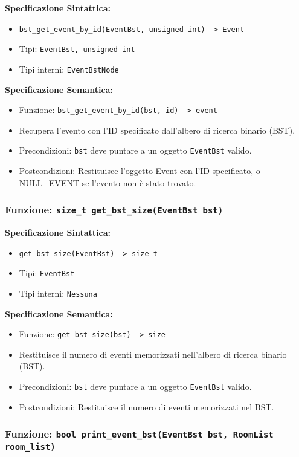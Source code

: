 \documentclass[11pt]{scrartcl} %
\begin{document}
\textbf{Specificazione Sintattica:}
\begin{itemize}
\item \texttt{bst\_get\_event\_by\_id(EventBst, unsigned int) -> Event}
\item Tipi: \texttt{EventBst, unsigned int}
\item Tipi interni: \texttt{EventBstNode}
\end{itemize}

\textbf{Specificazione Semantica:}
\begin{itemize}
\item Funzione: \texttt{bst\_get\_event\_by\_id(bst, id) -> event}
\item Recupera l'evento con l'ID specificato dall'albero di ricerca binario (BST).
\item Precondizioni: \texttt{bst} deve puntare a un oggetto \texttt{EventBst} valido.
\item Postcondizioni: Restituisce l'oggetto Event con l'ID specificato, o NULL\_EVENT se l'evento non è stato trovato.
\end{itemize}

\subsubsection{Funzione: \texttt{size\_t get\_bst\_size(EventBst bst)}}

\textbf{Specificazione Sintattica:}
\begin{itemize}
\item \texttt{get\_bst\_size(EventBst) -> size\_t}
\item Tipi: \texttt{EventBst}
\item Tipi interni: \texttt{Nessuna}
\end{itemize}

\textbf{Specificazione Semantica:}
\begin{itemize}
\item Funzione: \texttt{get\_bst\_size(bst) -> size}
\item Restituisce il numero di eventi memorizzati nell'albero di ricerca binario (BST).
\item Precondizioni: \texttt{bst} deve puntare a un oggetto \texttt{EventBst} valido.
\item Postcondizioni: Restituisce il numero di eventi memorizzati nel BST.
\end{itemize}

\subsubsection{Funzione: \texttt{bool print\_event\_bst(EventBst bst, RoomList room\_list)}}
\end{document}
